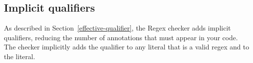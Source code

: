 \subsection{Implicit qualifiers\label{regex-implicit-qualifiers}}

As described in Section~\ref{effective-qualifier}, the Regex checker adds
implicit qualifiers, reducing the number of annotations that must appear
in your code. The checker implicitly adds the  qualifier to
any  literal that is a valid regex and to the 
literal.

